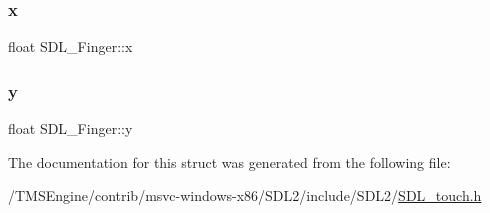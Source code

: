 \mbox{\label{struct_s_d_l___finger_ab91dfbd03c3215560457fef44e1c7755}} 
\subsubsection{\texorpdfstring{x}{x}}
{\footnotesize\ttfamily float S\+D\+L\+\_\+\+Finger\+::x}

\mbox{\label{struct_s_d_l___finger_a0a2c7a06ae641940111e03801c672cf9}} 
\subsubsection{\texorpdfstring{y}{y}}
{\footnotesize\ttfamily float S\+D\+L\+\_\+\+Finger\+::y}



The documentation for this struct was generated from the following file\+:\begin{DoxyCompactItemize}
\item 
/\+T\+M\+S\+Engine/contrib/msvc-\/windows-\/x86/\+S\+D\+L2/include/\+S\+D\+L2/\hyperlink{_s_d_l__touch_8h}{S\+D\+L\+\_\+touch.\+h}\end{DoxyCompactItemize}
